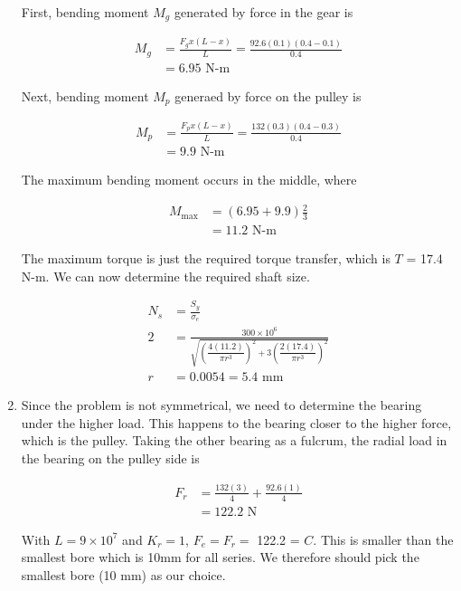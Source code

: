 \documentclass[a4paper,openany]{kaobook}
\begin{document}
\begin{enumerate}
First, bending moment \(M_{g}\) generated by force in the gear is

\begin{align*}
     M_{g} &= \frac{F_{g}x(L-x)}{L} = \frac{92.6(0.1)(0.4-0.1)}{0.4} \\
           &= 6.95 \text{ N-m}
   \end{align*}

Next, bending moment \(M_{p}\) generaed by force on the pulley is

\begin{align*}
     M_{p} &= \frac{F_{p}x(L-x)}{L} = \frac{132(0.3)(0.4-0.3)}{0.4} \\
           &= 9.9 \text{ N-m}
   \end{align*}

The maximum bending moment occurs in the middle, where

\begin{align*}
     M_{\max} &= (6.95 + 9.9)\frac{2}{3} \\
              &= 11.2 \text{ N-m}
   \end{align*}

The maximum torque is just the required torque transfer, which is
\(T\) = 17.4 N-m. We can now determine the required shaft size.

\begin{align}
  N_{s} &= \frac{S_{y}}{\sigma_{e}} \\
  2 &= \frac{300 \times 10^{6}}{\sqrt{ \left( \dfrac{4(11.2)}{\pi r^{3}} \right)^{2} + 3 \left( \dfrac{2(17.4)}{\pi r^{3}} \right)^{2} }} \\
  r &= 0.0054 = 5.4 \text{ mm}
\end{align}

\item Since the problem is not symmetrical, we need to determine the bearing under the higher load. This happens to the bearing closer to the higher force, which is the pulley. Taking the other bearing as a fulcrum, the radial load in the bearing on the pulley side is

\begin{align*}
     F_{r} &= \frac{132(3)}{4} + \frac{92.6(1)}{4} \\
           &= 122.2 \text{ N}
   \end{align*}

With \(L = 9 \times 10^{7}\) and \(K_{r} = 1\), \(F_{e} = F_{r} =\) 122.2 = \(C\). This is smaller than the smallest bore which is 10mm for all series. We therefore should pick the smallest
bore (10 mm) as our choice.
\end{enumerate}

\backmatter

\printbibliography
\end{document}
